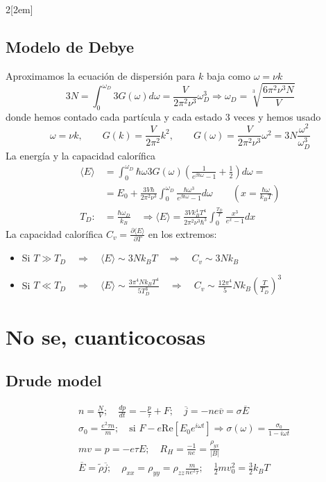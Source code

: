 \documentclass[leqno]{article}
\begin{document}
\begin{multicols}{2}[\columnsep2em]
\subsection{Modelo de Debye}
Aproximamos la ecuación de dispersión para $k$ baja como  $\omega = \nu k$
\[
  3N = \int_0^{\omega _D} 3G(\omega )d\omega = \frac{V}{2\pi^2 \nu^3}\omega _D^3 \Rightarrow \boxed{\omega _D = \sqrt[3]{\frac{6\pi^2\nu^3N}{V}} }
\] 
donde hemos contado cada partícula y cada estado 3 veces y hemos usado
\[
\omega = \nu k, \qquad G(k)=\frac{V}{2\pi^2}k^2, \qquad G(\omega )= \frac{V}{2\pi^2 \nu^3}\omega ^2 = 3N \frac{\omega ^2}{\omega ^3_D}
\]
La energía y la capacidad calorífica
\begin{align*}
  \langle E \rangle &= \int_0^{\omega _D}\hbar \omega 3G(\omega )\left( \frac{1}{e^{\beta \hbar \omega }-1} +\frac{1}{2} \right) d\omega  =\\
					&=E_0 + \frac{3V\hbar }{2\pi^2\nu^3} \int_0^{\omega _D}\frac{\hbar \omega ^3}{e^{\beta \hbar \omega }-1} d\omega \qquad (x=\frac{\hbar \omega }{k_B T})\\
  T_D :&= \frac{\hbar \omega_D }{k_B} \quad   \Rightarrow  \boxed{\langle E \rangle = \frac{3Vk_B^4T^4}{2\pi^2\nu^3\hbar ^3}\int_0^{\frac{T_D}{T}}\frac{x^3}{e^x-1}dx }
\end{align*}
La capacidad calorífica $C_v = \frac{\partial \langle E \rangle }{\partial T}$ en los extremos:
\begin{itemize}[topsep=-6pt, itemsep=0pt]
  \item Si $T\gg T_D \quad \Rightarrow \quad \langle E \rangle \sim 3Nk_BT \quad \Rightarrow \quad C_v \sim  3Nk_B $
  \item Si $T\ll T_D \quad \Rightarrow \quad \langle E \rangle \sim  \frac{3\pi^4Nk_BT^4}{5T_D^3}\quad\Rightarrow \quad C_v \sim  \frac{12\pi^4}{5}Nk_B \left( \frac{T}{T_D} \right)^3 $
\end{itemize}

\section{No se, cuanticocosas}
\subsection{Drude model}
\begin{align*}
  &n=\frac{N}{V}; \quad\frac{dp}{dt} = -\frac{p}{\tau}+F; \quad \overline{j} = -ne \overline{v} = \sigma \overline{E}\\
  & \sigma _0 = \frac{e^2\tau n}{m}; \quad \text{si } F -e\text{Re}[E_0e ^{i\omega t}] \Rightarrow \sigma (\omega ) = \frac{\sigma _0}{1-i\omega t}\\
  & mv=p=-e\tau E; \quad R_H = \frac{-1}{ne} = \frac{\rho_{yx}}{|B|}\\
  &\overline{E} = \tilde{\rho }\overline{j}; \quad \rho _{x x} = \rho _{yy}=\rho _{zz} \frac{m}{ne^2\tau }; \quad \frac{1}{2}mv_0^2= \frac{3}{2}k_BT
\end{align*}


\end{multicols}
\end{document}
